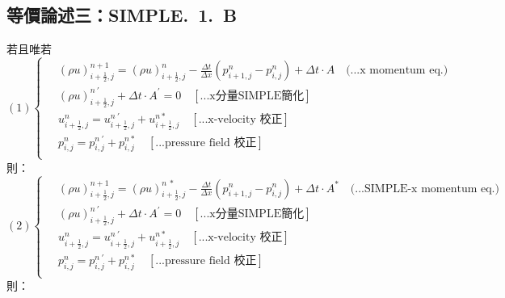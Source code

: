\documentclass[12pt]{article}
\begin{document}
\subsection{等價論述三：SIMPLE.\ 1.\ B}
\label{1.B.e}
\noindent 若且唯若\\
\begin{equation}
(1)
\left\{
\begin{aligned}
    \ &(\rho u)_{i+\frac{1}{2},j}^{n+1} = (\rho u)_{i+\frac{1}{2},j}^{n} - \frac{\Delta t}{\Delta x}(p_{i+1,j}^{n} - p_{i,j}^{n}) + \Delta t \cdot A  \quad \text{(...x momentum eq.)}\\[1.5ex]
    \ &(\rho u)_{i+\frac{1}{2},j}^{n\ \prime} + \Delta t \cdot A^{\prime} = 0\quad \left[\text{...x分量SIMPLE簡化}\right]\\[1.5ex]
    \ &u_{i+\frac{1}{2},j}^{n} = u_{i+\frac{1}{2},j}^{n\ '} + u_{i+\frac{1}{2},j}^{n *}  \quad \left[\text{...x-velocity 校正}\right]\\[1.5ex]
    \ &p_{i,j}^{n} = p_{i,j}^{n\ '} + p_{i,j}^{n *} \quad\left[\text{...pressure field 校正}\right]\\[1.5ex]
\end{aligned}
\right.
\end{equation}
\noindent 則：\\
\begin{equation}
(2)
\left\{
\begin{aligned}
    \ &(\rho u)_{i+\frac{1}{2},j}^{n+1} = (\rho u)_{i+\frac{1}{2},j}^{n\ *} - \frac{\Delta t}{\Delta x}(p_{i+1,j}^{n} - p_{i,j}^{n}) + \Delta t \cdot A^{*}  \quad \text{(...SIMPLE-x momentum eq.)}\\[1.5ex]
    \ &(\rho u)_{i+\frac{1}{2},j}^{n\ \prime} + \Delta t \cdot A^{\prime} = 0\quad \left[\text{...x分量SIMPLE簡化}\right]\\[1.5ex]
    \ &u_{i+\frac{1}{2},j}^{n} = u_{i+\frac{1}{2},j}^{n\ '} + u_{i+\frac{1}{2},j}^{n *}  \quad \left[\text{...x-velocity 校正}\right]\\[1.5ex]
    \ &p_{i,j}^{n} = p_{i,j}^{n\ '} + p_{i,j}^{n *} \quad\left[\text{...pressure field 校正}\right]\\[1.5ex]
\end{aligned}
\right.
\end{equation}
\noindent 則：\\
\end{document}
